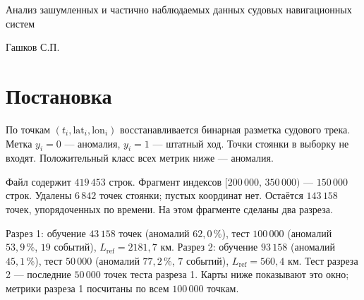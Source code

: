 \documentclass[a4paper,12pt]{report}
\begin{document}
	
	
	\thispagestyle{empty}
	{ \large
		\begin{center}
			\renewcommand{\baselinestretch}{1.2}
			\Large
			{\Large Анализ зашумленных и частично наблюдаемых данных судовых навигационных систем}
		\end{center}
		\medskip%
		
		\vspace{3\bigskipamount}%
		\begin{flushright}
			\begin{minipage}{0.5\textwidth}
				\begin{flushleft}
					Гашков С.П.
				\end{flushleft}
			\end{minipage}
		\end{flushright}
		
		\vfill%
	}
	
	
	\large
	
	\onehalfspacing
	
\clearpage
\renewcommand{\thesection}{\arabic{section}}
\graphicspath{{../pict/}}

\section{Постановка}

По точкам \((t_i,\mathrm{lat}_i,\mathrm{lon}_i)\) восстанавливается бинарная разметка судового трека. Метка \(y_i=0\) — аномалия, \(y_i=1\) — штатный ход. Точки стоянки в выборку не входят. Положительный класс всех метрик ниже — аномалия.

Файл содержит \(419\,453\) строк. Фрагмент индексов \([200\,000,\,350\,000)\) --- \(150\,000\) строк. Удалены \(6\,842\) точек стоянки; пустых координат нет. Остаётся \(143\,158\) точек, упорядоченных по времени. На этом фрагменте сделаны два разреза.

Разрез 1: обучение \(43\,158\) точек (аномалий \(62{,}0\,\%\)), тест \(100\,000\) (аномалий \(53{,}9\,\%\), \(19\) событий), \(L_{\mathrm{ref}}=2181{,}7\) км. Разрез 2: обучение \(93\,158\) (аномалий \(45{,}1\,\%\)), тест \(50\,000\) (аномалий \(77{,}2\,\%\), \(7\) событий), \(L_{\mathrm{ref}}=560{,}4\) км. Тест разреза 2 --- последние \(50\,000\) точек теста разреза 1. Карты ниже показывают это окно; метрики разреза 1 посчитаны по всем \(100\,000\) точкам.
\end{document}
